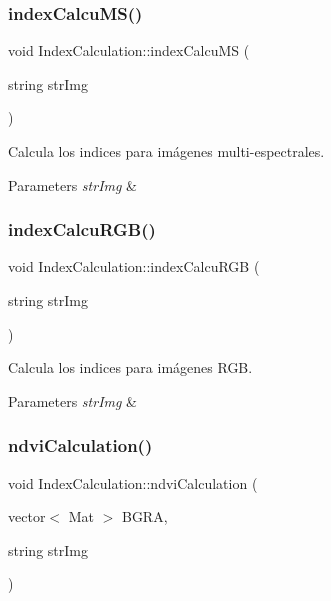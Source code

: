 \subsubsection{\texorpdfstring{index\+Calcu\+M\+S()}{indexCalcuMS()}}
{\footnotesize\ttfamily void Index\+Calculation\+::index\+Calcu\+MS (\begin{DoxyParamCaption}\item[{string}]{str\+Img }\end{DoxyParamCaption})\hspace{0.3cm}{\ttfamily [inline]}}



Calcula los indices para imágenes multi-\/espectrales. 


\begin{DoxyParams}{Parameters}
{\em str\+Img} & \\
\hline
\end{DoxyParams}
\mbox{\label{classIndexCalculation_a7070ce3aebd8abd71074270eff8f88b6}} 
\subsubsection{\texorpdfstring{index\+Calcu\+R\+G\+B()}{indexCalcuRGB()}}
{\footnotesize\ttfamily void Index\+Calculation\+::index\+Calcu\+R\+GB (\begin{DoxyParamCaption}\item[{string}]{str\+Img }\end{DoxyParamCaption})\hspace{0.3cm}{\ttfamily [inline]}}



Calcula los indices para imágenes R\+GB. 


\begin{DoxyParams}{Parameters}
{\em str\+Img} & \\
\hline
\end{DoxyParams}
\mbox{\label{classIndexCalculation_a4d727b91eeb0676b3ffcfaf26ec02a32}} 
\subsubsection{\texorpdfstring{ndvi\+Calculation()}{ndviCalculation()}}
{\footnotesize\ttfamily void Index\+Calculation\+::ndvi\+Calculation (\begin{DoxyParamCaption}\item[{vector$<$ Mat $>$}]{B\+G\+RA,  }\item[{string}]{str\+Img }\end{DoxyParamCaption})\hspace{0.3cm}{\ttfamily [inline]}}



